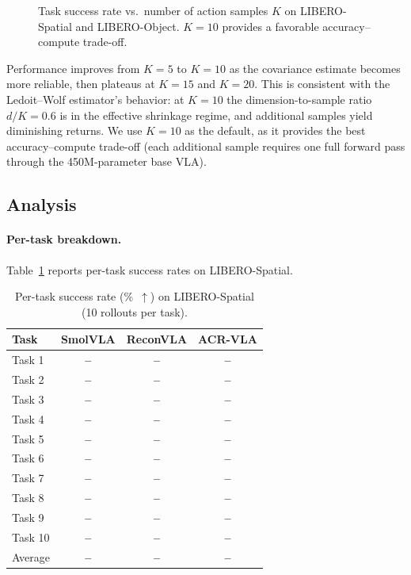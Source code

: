 \begin{figure}[t]
\centering
\caption{Task success rate vs.\ number of action samples $K$ on LIBERO-Spatial and LIBERO-Object. $K{=}10$ provides a favorable accuracy--compute trade-off.}
\label{fig:k_sensitivity}
\end{figure}

Performance improves from $K{=}5$ to $K{=}10$ as the covariance estimate becomes more reliable, then plateaus at $K{=}15$ and $K{=}20$.
This is consistent with the Ledoit--Wolf estimator's behavior: at $K{=}10$ the dimension-to-sample ratio $d/K{=}0.6$ is in the effective shrinkage regime, and additional samples yield diminishing returns.
We use $K{=}10$ as the default, as it provides the best accuracy--compute trade-off (each additional sample requires one full forward pass through the 450M-parameter base VLA).


\subsection{Analysis}
\label{sec:analysis}

\paragraph{Per-task breakdown.}
Table~\ref{tab:per_task} reports per-task success rates on LIBERO-Spatial.

\begin{table}[t]
\centering
\caption{Per-task success rate (\%~$\uparrow$) on LIBERO-Spatial (10 rollouts per task).}
\label{tab:per_task}
\small
\begin{tabular}{lccc}
\toprule
Task & SmolVLA & ReconVLA & ACR-VLA \\
\midrule
Task 1  & \textbf{--} & \textbf{--} & \textbf{--} \\
Task 2  & \textbf{--} & \textbf{--} & \textbf{--} \\
Task 3  & \textbf{--} & \textbf{--} & \textbf{--} \\
Task 4  & \textbf{--} & \textbf{--} & \textbf{--} \\
Task 5  & \textbf{--} & \textbf{--} & \textbf{--} \\
Task 6  & \textbf{--} & \textbf{--} & \textbf{--} \\
Task 7  & \textbf{--} & \textbf{--} & \textbf{--} \\
Task 8  & \textbf{--} & \textbf{--} & \textbf{--} \\
Task 9  & \textbf{--} & \textbf{--} & \textbf{--} \\
Task 10 & \textbf{--} & \textbf{--} & \textbf{--} \\
\midrule
Average & \textbf{--} & \textbf{--} & \textbf{--} \\
\bottomrule
\end{tabular}
\end{table}

